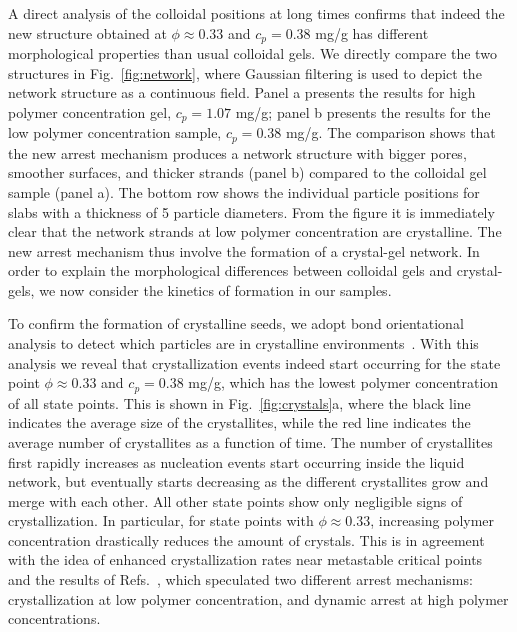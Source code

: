 \documentclass[preprint,amsmath,amssymb,superscriptaddress]{revtex4-1}
\begin{document}
A direct analysis of the colloidal positions at long times confirms that indeed the new structure obtained at
$\phi\approx 0.33$ and $c_p=0.38$ mg/g has different morphological properties than usual colloidal gels.
We directly compare the two structures in Fig.~\ref{fig:network}, where Gaussian filtering is used to depict the network structure as a continuous field.
Panel a presents the results for high
polymer concentration gel, $c_p=1.07$ mg/g; panel b presents the results for the low polymer concentration sample, $c_p=0.38$ mg/g.
The comparison shows that the new arrest mechanism produces a network structure with bigger pores, smoother surfaces, and thicker strands (panel b) compared
to the colloidal gel sample (panel a). The bottom row shows the individual particle positions for slabs with a thickness of 5 particle diameters.
From the figure it is immediately clear that the network strands at low polymer concentration are crystalline. The new arrest mechanism thus
involve the formation of a crystal-gel network. In order to explain the morphological differences between colloidal gels and crystal-gels,
we now consider the kinetics of formation in our samples. 


To confirm the formation of crystalline seeds, we adopt bond orientational analysis to detect which particles are in crystalline environments~\cite{russo2013interplay}. 
With this analysis we reveal that crystallization events indeed start occurring for the state point $\phi\approx 0.33$ and $c_p=0.38$ mg/g, which has the lowest
polymer concentration of all state points. This is shown in Fig.~\ref{fig:crystals}a, where the black line indicates the average size of the crystallites, 
while the red line indicates the average number of crystallites as a function of time. The number of crystallites first rapidly increases as nucleation events
start occurring inside the liquid network, but eventually starts decreasing as the different crystallites grow and merge with each other.
All other state points show only negligible signs of crystallization. In particular, for state points with $\phi\approx 0.33$, increasing
polymer concentration drastically reduces the amount of crystals. This is in agreement with the
idea of enhanced crystallization rates near metastable critical points~\cite{ten1997enhancement,olmsted1998spinodal} and the
results of Refs.~\cite{soga1999metastable,fortini2008crystallization,perez2011pathways},
which speculated two different arrest mechanisms: crystallization at low polymer concentration, and dynamic arrest at high polymer concentrations.
\end{document}
